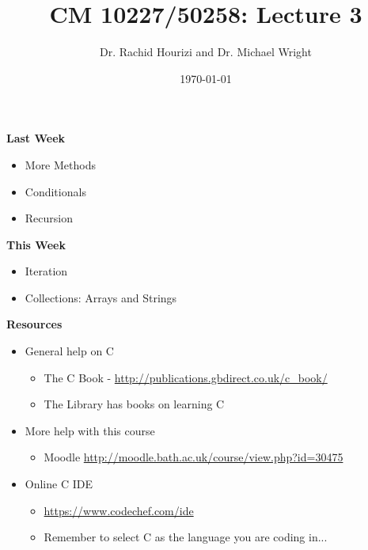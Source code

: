 \documentclass{beamer}
\begin{document}

\title{CM 10227/50258: Lecture 3}
\author{Dr. Rachid Hourizi and Dr. Michael Wright}
\date{\today}
\frame{\titlepage}

\begin{frame}
\begin{center}
\textbf{Last Week}
\end{center}

\begin{itemize}
\item More Methods
\item Conditionals
\item Recursion
\end{itemize}
 \end{frame}

\begin{frame} 
\begin{center}
\textbf{This Week}
\end{center}

\begin{itemize}
\item Iteration
\item Collections: Arrays and Strings
\end{itemize}
 \end{frame}

\begin{frame} 
\begin{center}
\textbf{Resources}
\end{center}
\begin{itemize}
\item General help on C
\begin{itemize}
\item The C Book - \url{http://publications.gbdirect.co.uk/c_book/}
\item The Library has books on learning C
\end{itemize}
\item More help with this course
\begin{itemize}
\item Moodle \url{http://moodle.bath.ac.uk/course/view.php?id=30475}
\end{itemize}
\item Online C IDE
\begin{itemize}
\item \url{https://www.codechef.com/ide}
\item Remember to select C as the language you are coding in...
\end{itemize}
\end{itemize}
\end{frame}
\end{document}
